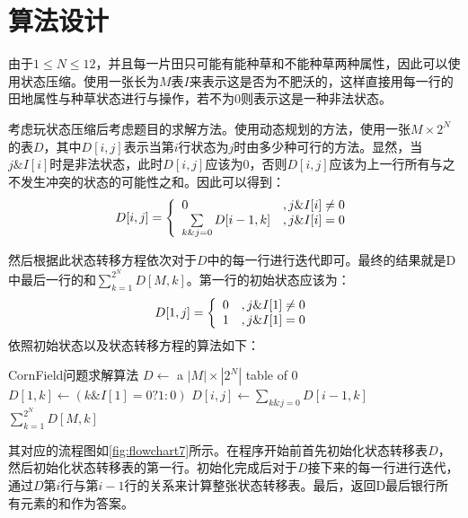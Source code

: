 \documentclass{report}
\begin{document}
\section{算法设计}
\label{sec:suan_fa_she_ji_7}
由于$1\leq N\leq 12$，并且每一片田只可能有能种草和不能种草两种属性，因此可以使用状态压缩。使用一张长为$M$表$I$来表示这是否为不肥沃的，这样直接用每一行的田地属性与种草状态进行与操作，若不为0则表示这是一种非法状态。\par
考虑玩状态压缩后考虑题目的求解方法。使用动态规划的方法，使用一张$M\times 2^N$的表$D$，其中$D[i,j]$表示当第$i$行状态为$j$时由多少种可行的方法。显然，当$j\&I[i]$时是非法状态，此时$D[i,j]$应该为0，否则$D[i,j]$应该为上一行所有与之不发生冲突的状态的可能性之和。因此可以得到：
\[
    D[i,j]=\left\{
        \begin{array}{l l}
            0 & , j\&I[i] \neq 0 \\
            \sum\limits_{k\&j=0} D[i-1, k] & , j\&I[i] = 0
        \end{array}
    \right.
\]

然后根据此状态转移方程依次对于$D$中的每一行进行迭代即可。最终的结果就是D中最后一行的和$\sum_{k=1}^{2^N}D[M, k]$。第一行的初始状态应该为：
\[
    D[1, j]=\left\{
        \begin{array}{l l}
            0 & , j\&I[1] \neq 0 \\
            1 & , j\&I[1] = 0 \\
        \end{array}
    \right.
\]
依照初始状态以及状态转移方程的算法如下：
\begin{simpleAlgorithm}{CornField问题求解算法}
    \State $D \gets $ a $|M|\times |2^N|$ table of 0 
    \State $D[1,k] \gets (k\&I[1] = 0 ? 1 : 0)$
                \State $D[i, j] \gets \sum_{k\&j=0} D[i-1, k]$
            \EndIf
        \EndFor
    \EndFor
    \State \Return $\sum\limits_{k=1}^{2^N}D[M, k]$
    \EndProcedure
\end{simpleAlgorithm}

其对应的流程图如\ref{fig:flowchart7}所示。在程序开始前首先初始化状态转移表$D$，然后初始化状态转移表的第一行。初始化完成后对于$D$接下来的每一行进行迭代，通过$D$第$i$行与第$i-1$行的关系来计算整张状态转移表。最后，返回D最后银行所有元素的和作为答案。
\end{document}
